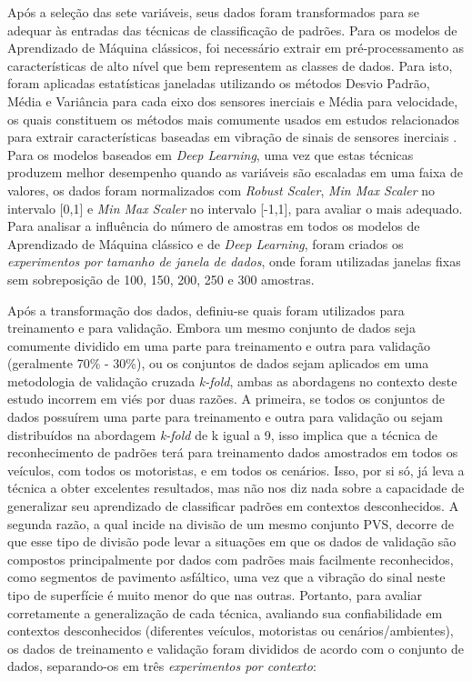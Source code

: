 Após a seleção das sete variáveis, seus dados foram transformados para se adequar às entradas das técnicas de classificação de padrões. Para os modelos de Aprendizado de Máquina clássicos, foi necessário extrair em pré-processamento as características de alto nível que bem representem as classes de dados. Para isto, foram aplicadas estatísticas janeladas utilizando os métodos Desvio Padrão, Média e Variância para cada eixo dos sensores inerciais e Média para velocidade, os quais constituem os métodos mais comumente usados em estudos relacionados para extrair características baseadas em vibração de sinais de sensores inerciais \cite{Alqudah2016,Andria2016,BelloSalau2018,Bose2018,Hou2017,Li2016,Lima2016,Pholprasit2015,Prapulla2017,Savera2016,Singh2017}. Para os modelos baseados em \textit{Deep Learning}, uma vez que estas técnicas produzem melhor desempenho quando as variáveis são escaladas em uma faixa de valores, os dados foram normalizados com \textit{Robust Scaler}, \textit{Min Max Scaler} no intervalo [0,1] e \textit{Min Max Scaler} no intervalo [-1,1], para avaliar o mais adequado. Para analisar a influência do número de amostras em todos os modelos de Aprendizado de Máquina clássico e de \textit{Deep Learning}, foram criados os \emph{experimentos por tamanho de janela de dados}, onde foram utilizadas janelas fixas sem sobreposição de 100, 150, 200, 250 e 300 amostras. 

Após a transformação dos dados, definiu-se quais foram utilizados para treinamento e para validação. Embora um mesmo conjunto de dados seja comumente dividido em uma parte para treinamento e outra para validação (geralmente 70\% - 30\%), ou os conjuntos de dados sejam aplicados em uma metodologia de validação cruzada \textit{k-fold}, ambas as abordagens no contexto deste estudo incorrem em viés por duas razões. A primeira, se todos os conjuntos de dados possuírem uma parte para treinamento e outra para validação ou sejam distribuídos na abordagem \textit{k-fold} de k igual a 9, isso implica que a técnica de reconhecimento de padrões terá para treinamento dados amostrados em todos os veículos, com todos os motoristas, e em todos os cenários. Isso, por si só, já leva a técnica a obter excelentes resultados, mas não nos diz nada sobre a capacidade de generalizar seu aprendizado de classificar padrões em contextos desconhecidos. A segunda razão, a qual incide na divisão de um mesmo conjunto PVS, decorre de que esse tipo de divisão pode levar a situações em que os dados de validação são compostos principalmente por dados com padrões mais facilmente reconhecidos, como segmentos de pavimento asfáltico, uma vez que a vibração do sinal neste tipo de superfície é muito menor do que nas outras. Portanto, para avaliar corretamente a generalização de cada técnica, avaliando sua confiabilidade em contextos desconhecidos (diferentes veículos, motoristas ou cenários/ambientes), os dados de treinamento e validação foram divididos de acordo com o conjunto de dados, separando-os em três \emph{experimentos por contexto}:

